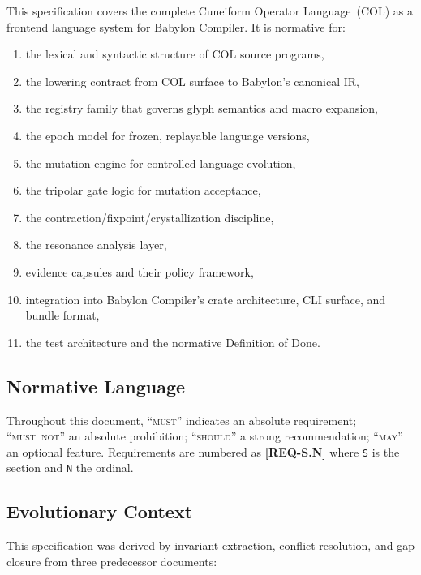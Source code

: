 \documentclass[11pt,a4paper,twoside]{article}
\theoremstyle{definition}
\theoremstyle{remark}
\newcommand{\req}[1]{\textbf{\textcolor{reqred}{[REQ-#1]}}}
\newcommand{\must}{\textsc{must}}
\newcommand{\mustnot}{\textsc{must~not}}
\newcommand{\should}{\textsc{should}}
\newcommand{\may}{\textsc{may}}
\begin{document}
This specification covers the complete Cuneiform Operator Language~(COL) as a frontend language system for Babylon Compiler. It is normative for:

\begin{enumerate}[label=(\alph*)]
  \item the lexical and syntactic structure of COL source programs,
  \item the lowering contract from COL surface to Babylon's canonical IR,
  \item the registry family that governs glyph semantics and macro expansion,
  \item the epoch model for frozen, replayable language versions,
  \item the mutation engine for controlled language evolution,
  \item the tripolar gate logic for mutation acceptance,
  \item the contraction/fixpoint/crystallization discipline,
  \item the resonance analysis layer,
  \item evidence capsules and their policy framework,
  \item integration into Babylon Compiler's crate architecture, CLI surface, and bundle format,
  \item the test architecture and the normative Definition of Done.
\end{enumerate}

\subsection{Normative Language}

Throughout this document, ``\must'' indicates an absolute requirement; ``\mustnot'' an absolute prohibition; ``\should'' a strong recommendation; ``\may'' an optional feature. Requirements are numbered as \req{S.N} where \texttt{S} is the section and \texttt{N} the ordinal.

\subsection{Evolutionary Context}

This specification was derived by invariant extraction, conflict resolution, and gap closure from three predecessor documents:
\end{document}
